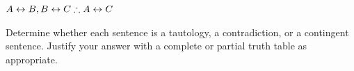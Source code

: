 \begin{compactlist}
\item $A\leftrightarrow B, B\leftrightarrow C \therefore A\leftrightarrow C$ %
\end{compactlist}

\problempart
\label{pr.TT.TTorC3}
Determine whether each sentence is a tautology, a contradiction, or a contingent sentence. Justify your answer with a complete or partial truth table as appropriate.


